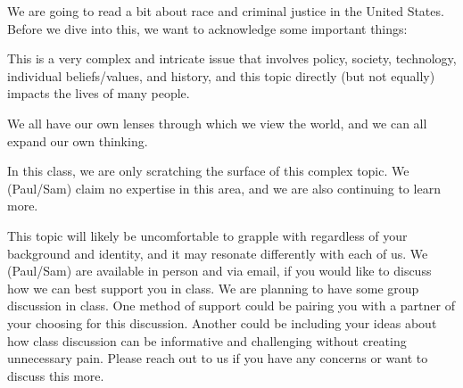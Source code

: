 \documentclass[assignment02_Solutions]{subfiles}
\begin{document}
\begin{notice}
We are going to read a bit about race and criminal justice in the United States. Before we dive into this, we want to acknowledge some important things:

\bi
\item This is a very complex and intricate issue that involves policy, society, technology, individual beliefs/values, and history, and this topic directly (but not equally) impacts the lives of many people.
\item We all have our own lenses through which we view the world, and we can all expand our own thinking. 
\item In this class, we are only scratching the surface of this complex topic. We (Paul/Sam) claim no expertise in this area, and we are also continuing to learn more.
\item This topic will likely be uncomfortable to grapple with regardless of your background and identity, and it may resonate differently with each of us. We (Paul/Sam) are available in person and via email, if you would like to discuss how we can best support you in class. We are planning to have some group discussion in class. One method of support could be pairing you with a partner of your choosing for this discussion. Another could be including your ideas about how class discussion can be informative and challenging without creating unnecessary pain. Please reach out to us if you have any concerns or want to discuss this more.
\ei
\end{notice}
\end{document}
